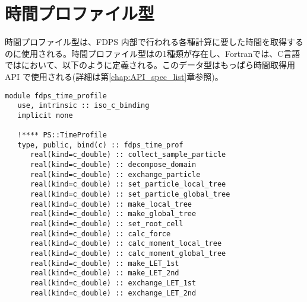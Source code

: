 \section{時間プロファイル型}
\label{sec:time_profile_types}
時間プロファイル型は、FDPS 内部で行われる各種計算に要した時間を取得するのに使用される。時間プロファイル型はの1種類が存在し、Fortranでは、C言語ではにおいて、以下のように定義される。このデータ型はもっぱら時間取得用 API で使用される(詳細は第\ref{chap:API_spec_list}章参照)。

\begin{lstlisting}[caption=時間プロファイル型 (Fortran)]
module fdps_time_profile
   use, intrinsic :: iso_c_binding
   implicit none

   !**** PS::TimeProfile
   type, public, bind(c) :: fdps_time_prof
      real(kind=c_double) :: collect_sample_particle                                               
      real(kind=c_double) :: decompose_domain                                                      
      real(kind=c_double) :: exchange_particle                                                     
      real(kind=c_double) :: set_particle_local_tree                                               
      real(kind=c_double) :: set_particle_global_tree                                              
      real(kind=c_double) :: make_local_tree                                                       
      real(kind=c_double) :: make_global_tree                                                      
      real(kind=c_double) :: set_root_cell                                                         
      real(kind=c_double) :: calc_force                                                            
      real(kind=c_double) :: calc_moment_local_tree                                                
      real(kind=c_double) :: calc_moment_global_tree                                               
      real(kind=c_double) :: make_LET_1st                                                          
      real(kind=c_double) :: make_LET_2nd                                                          
      real(kind=c_double) :: exchange_LET_1st                                                      
      real(kind=c_double) :: exchange_LET_2nd                                                      
                                                                                                   

\end{lstlisting}
